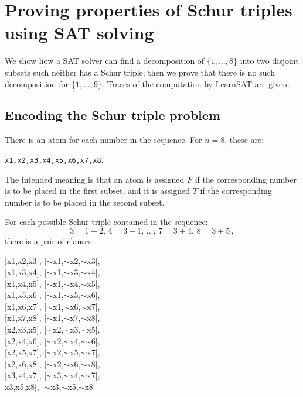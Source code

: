 \documentclass[11pt,a4paper]{article}
\begin{document}
\section{Proving properties of Schur triples using SAT solving}

We show how a SAT solver can find a decomposition of $\{1,\ldots,8\}$ into two disjoint subsets such neither has a Schur triple; then we prove that there is no such decomposition for $\{1,\ldots,9\}$. Traces of the computation by LearnSAT are given.

\subsection*{Encoding the Schur triple problem}

There is an atom for each number in the sequence. For $n=8$, these are:
\begin{center}
\texttt{x1,x2,x3,x4,x5,x6,x7,x8}.
\end{center}
The intended meaning is that an atom is assigned $F$ if the corresponding number is to be placed in the first subset, and it is assigned $T$ if the corresponding number is to be placed in the second subset.

For each possible Schur triple contained in the sequence:
\[
3=1+2,\, 4=3+1,\, \ldots,\, 7=3+4,\, 8=3+5\,,
\]
there is a pair of clauses:
\begin{center}
\begin{ttfamily}
{[}x1,x2,x3], [$\sim$x1,$\sim$x2,$\sim$x3],\\
{[}x1,x3,x4], [$\sim$x1,$\sim$x3,$\sim$x4],\\
{[}x1,x4,x5], [$\sim$x1,$\sim$x4,$\sim$x5],\\
{[}x1,x5,x6], [$\sim$x1,$\sim$x5,$\sim$x6],\\
{[}x1,x6,x7], [$\sim$x1,$\sim$x6,$\sim$x7],\\
{[}x1,x7,x8], [$\sim$x1,$\sim$x7,$\sim$x8],\\
{[}x2,x3,x5], [$\sim$x2,$\sim$x3,$\sim$x5],\\
{[}x2,x4,x6], [$\sim$x2,$\sim$x4,$\sim$x6],\\
{[}x2,x5,x7], [$\sim$x2,$\sim$x5,$\sim$x7],\\
{[}x2,x6,x8], [$\sim$x2,$\sim$x6,$\sim$x8],\\
{[}x3,x4,x7], [$\sim$x3,$\sim$x4,$\sim$x7],\\
\hspace*{-5pt}{[}x3,x5,x8], [$\sim$x3,$\sim$x5,$\sim$x8]\\
\end{ttfamily}
\end{center}
\end{document}
